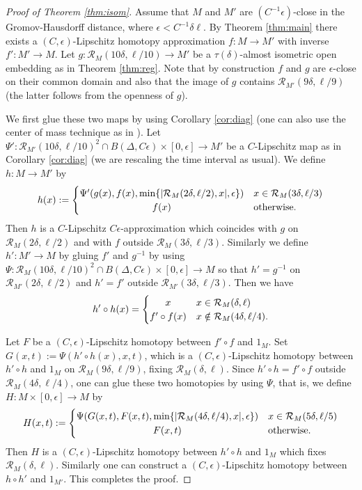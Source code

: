 \documentclass[a4paper,12pt]{amsart}
\theoremstyle{plain}
\theoremstyle{definition}
\numberwithin{thm}{section}
\numberwithin{equation}{section}
\begin{document}
\begin{proof}[Proof of Theorem \ref{thm:isom}]
Assume that $M$ and $M'$ are $(C^{-1}\epsilon)$-close in the Gromov-Hausdorff distance, where $\epsilon<C^{-1}\delta\ell$.
By Theorem \ref{thm:main} there exists a $(C,\epsilon)$-Lipschitz homotopy approximation $f:M\to M'$ with inverse $f':M'\to M$.
Let $g:\mathcal R_M(10\delta,\ell/10)\to M'$ be a $\tau(\delta)$-almost isometric open embedding as in Theorem \ref{thm:reg}.
Note that by construction $f$ and $g$ are $\epsilon$-close on their common domain and also that the image of $g$ contains $\mathcal R_{M'}(9\delta,\ell/9)$ (the latter follows from the openness of $g$).

We first glue these two maps by using Corollary \ref{cor:diag} (one can also use the center of mass technique as in \cite{MY:lip}).
Let $\Psi':\mathcal R_{M'}(10\delta,\ell/10)^2\cap B(\Delta,C\epsilon)\times[0,\epsilon]\to M'$ be a $C$-Lipschitz map as in Corollary \ref{cor:diag} (we are rescaling the time interval as usual).
We define $h:M\to M'$ by
\[
h(x):=
\begin{cases}
\Psi'(g(x),f(x),\min\{|\mathcal R_M(2\delta,\ell/2),x|,\epsilon\}) & x\in\mathcal R_M(3\delta,\ell/3)\\
\hfil f(x) &  \text{otherwise}.
\end{cases}
\]
Then $h$ is a $C$-Lipschitz $C\epsilon$-approximation which coincides with $g$ on $\mathcal R_M(2\delta,\ell/2)$ and with $f$ outside $\mathcal R_M(3\delta,\ell/3)$.
Similarly we define $h':M'\to M$ by gluing $f'$ and $g^{-1}$ by using $\Psi:\mathcal R_{M}(10\delta,\ell/10)^2\cap B(\Delta,C\epsilon)\times[0,\epsilon]\to M$ so that $h'=g^{-1}$ on $\mathcal R_{M'}(2\delta,\ell/2)$ and $h'=f'$ outside $\mathcal R_{M'}(3\delta,\ell/3)$.
Then we have
\[
h'\circ h(x)=
\begin{cases}
\hfil x & x\in\mathcal R_M(\delta,\ell) \\
f'\circ f(x) & x\notin\mathcal R_M(4\delta,\ell/4).
\end{cases}
\]

Let $F$ be a $(C,\epsilon)$-Lipschitz homotopy between $f'\circ f$ and $1_M$.
Set $G(x,t):=\Psi(h'\circ h(x),x,t)$, which is a $(C,\epsilon)$-Lipschitz homotopy between $h'\circ h$ and $1_M$ on $\mathcal R_M(9\delta,\ell/9)$, fixing $\mathcal R_M(\delta,\ell)$.
Since $h'\circ h=f'\circ f$ outside $\mathcal R_M(4\delta,\ell/4)$, one can glue these two homotopies by using $\Psi$, that is, we define $H:M\times[0,\epsilon]\to M$ by
\[H(x,t)
:=
\begin{cases}
\Psi(G(x,t),F(x,t),\min\{|\mathcal R_M(4\delta,\ell/4),x|,\epsilon\}) & x\in\mathcal R_M(5\delta,\ell/5)\\
\hfil F(x,t) & \text{otherwise}.
\end{cases}
\]
Then $H$ is a $(C,\epsilon)$-Lipschitz homotopy between $h'\circ h$ and $1_M$ which fixes $\mathcal R_M(\delta,\ell)$.
Similarly one can construct a $(C,\epsilon)$-Lipschitz homotopy between $h\circ h'$ and $1_{M'}$.
This completes the proof.
\end{proof}
\end{document}
